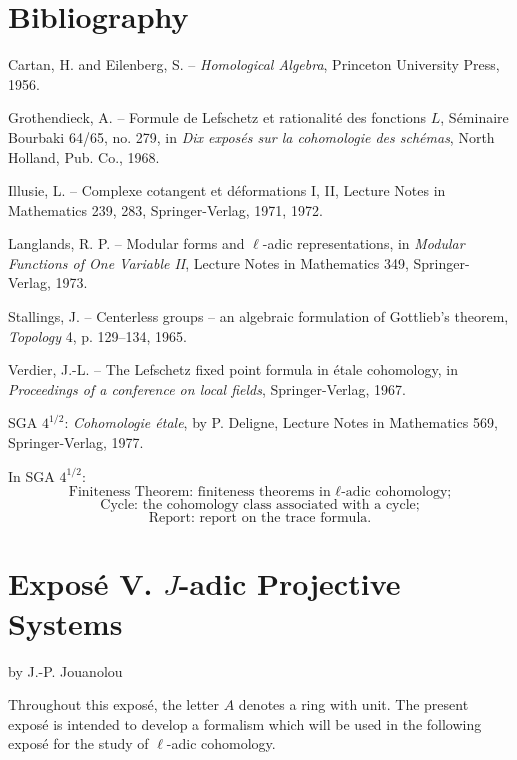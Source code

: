\documentclass[11pt]{article}
\begin{document}
\section*{Bibliography}

\begin{enumerate}[label={[\arabic*]}]
\item Cartan, H. and Eilenberg, S. -- \textit{Homological Algebra}, Princeton University Press, 1956.
\item Grothendieck, A. -- Formule de Lefschetz et rationalité des fonctions $L$, Séminaire Bourbaki 64/65, no. 279, in \textit{Dix exposés sur la cohomologie des schémas}, North Holland, Pub. Co., 1968.
\item Illusie, L. -- Complexe cotangent et déformations I, II, Lecture Notes in Mathematics 239, 283, Springer-Verlag, 1971, 1972.
\item Langlands, R. P. -- Modular forms and $\ell$-adic representations, in \textit{Modular Functions of One Variable II}, Lecture Notes in Mathematics 349, Springer-Verlag, 1973.
\item Stallings, J. -- Centerless groups -- an algebraic formulation of Gottlieb's theorem, \textit{Topology} 4, p. 129--134, 1965.
\item Verdier, J.-L. -- The Lefschetz fixed point formula in étale cohomology, in \textit{Proceedings of a conference on local fields}, Springer-Verlag, 1967.
\end{enumerate}

SGA $4^{1/2}$: \textit{Cohomologie étale}, by P. Deligne, Lecture Notes in Mathematics 569, Springer-Verlag, 1977.

In SGA $4^{1/2}$:
\[
\text{Finiteness Theorem: finiteness theorems in }\ell\text{-adic cohomology;}
\]
\[
\text{Cycle: the cohomology class associated with a cycle;}
\]
\[
\text{Report: report on the trace formula.}
\]


\label{sga5:V:expose:v}\section*{Exposé V. $J$-adic Projective Systems}
\begin{center}by J.-P. Jouanolou\end{center}

Throughout this exposé, the letter $A$ denotes a ring with unit. The present exposé is intended to develop a formalism which will be used in the following exposé for the study of $\ell$-adic cohomology.
\end{document}
